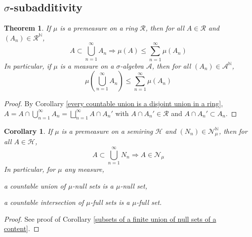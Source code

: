 \documentclass[11pt, a4paper, openany]{book}
\newtheorem{thm}{Theorem}\newtheorem{lem}{Lemma}\newtheorem{crl}{Corollary}
\theoremstyle{definition}
\newenvironment{tight_enumerate}{\begin{enumerate}\itemsep -0.2em}{\end{enumerate}}
\begin{document}
\subsection{\texorpdfstring{$\sigma$}{sigma}-subadditivity}
    \begin{thm}
        If $\mu$ is a premeasure on a ring $\mathscr{R}$, then for all $A\in\mathscr{R}$ and $(A_n)\in\mathscr{R}^\mathbb{N}$,
        \[
            A\subset \bigcup_{n=1}^\infty A_n\Longrightarrow\mu(A)\leqslant \sum_{n=1}^\infty \mu(A_n)
        \]
        In particular, if $\mu$ is a measure on a $\sigma$-algebra $\mathscr{A}$, then for all $(A_n)\in\mathscr{A}^\mathbb{N}$,
        \[
            \mu\left(\bigcup_{n=1}^\infty A_n\right)\leqslant \sum_{n=1}^\infty \mu(A_n)
        \]
    \end{thm}
    \begin{proof}
        By Corollary \ref{every countable union is a disjoint union in a ring}, $A=A\cap \bigcup_{n=1}^\infty A_n=\bigsqcup_{n=1}^\infty A\cap A_n'$ with $A\cap A_n'\in\mathscr{R}$ and $A\cap A_n'\subset A_n$.
    \end{proof}
    \begin{crl}\label{measurable subsets of a countable union of null sets is null}
        If $\mu$ is a premeasure on a semiring $\mathscr{H}$ and $(N_n)\in\mathscr{N}_\mu^\mathbb{N}$, then for all $A\in\mathscr{H}$,
        \[
            A\subset \bigcup_{n=1}^\infty N_n \Longrightarrow A\in\mathscr{N}_\mu
        \]
        In particular, for $\mu$ any measure, 
        \begin{tight_enumerate}
            \item a countable union of $\mu$-null sets is a $\mu$-null set,
            \item a countable intersection of $\mu$-full sets is a $\mu$-full set.
        \end{tight_enumerate}
    \end{crl}
    \begin{proof}
        See proof of Corollary \ref{subsets of a finite union of null sets of a content}.
    \end{proof}
\end{document}
